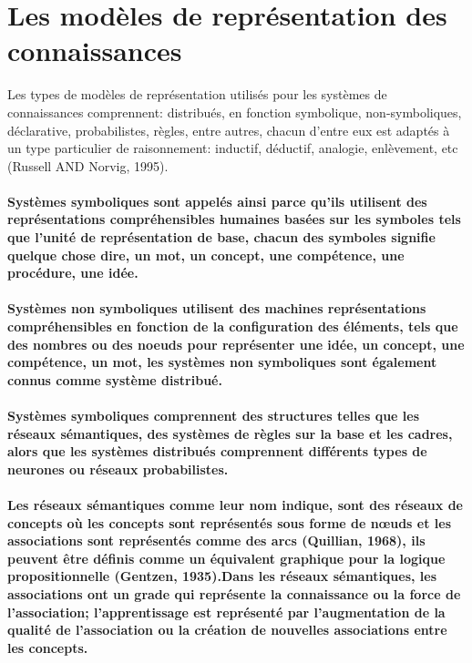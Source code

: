 \documentclass[12pt,a4paper]{report}
\begin{document}
\section{Les modèles de représentation des connaissances}
Les types de modèles de représentation utilisés pour les systèmes de connaissances comprennent: distribués, en fonction symbolique, non-symboliques, déclarative, probabilistes, règles, entre autres, chacun d'entre eux est adaptés à un type particulier de raisonnement: inductif, déductif, analogie, enlèvement, etc (Russell AND Norvig, 1995).\paragraph{\normalfont
Systèmes symboliques sont appelés ainsi parce qu'ils utilisent des représentations compréhensibles humaines basées sur les symboles tels que l'unité de représentation de base, chacun des symboles signifie quelque chose dire, un mot, un concept, une compétence, une procédure, une idée.}\paragraph{\normalfont
Systèmes non symboliques utilisent des machines représentations compréhensibles en fonction de la configuration des éléments, tels que des nombres ou des noeuds pour représenter une idée, un concept, une compétence, un mot, les systèmes non symboliques sont également connus comme système distribué.}\paragraph{\normalfont
Systèmes symboliques comprennent des structures telles que les réseaux sémantiques, des systèmes de règles sur la base et les cadres, alors que les systèmes distribués comprennent différents types de neurones ou réseaux probabilistes.}\paragraph{\normalfont
Les réseaux sémantiques comme leur nom indique, sont des réseaux de concepts où les concepts sont représentés sous forme de nœuds et les associations sont représentés comme des arcs (Quillian, 1968), ils peuvent être définis comme un équivalent graphique pour la logique propositionnelle (Gentzen, 1935).Dans les réseaux sémantiques, les associations ont un grade qui représente la connaissance ou la force de l'association; l'apprentissage est représenté par l'augmentation de la qualité de l'association ou la création de nouvelles associations entre les concepts.}\paragraph{\normalfont
}
\end{document}

